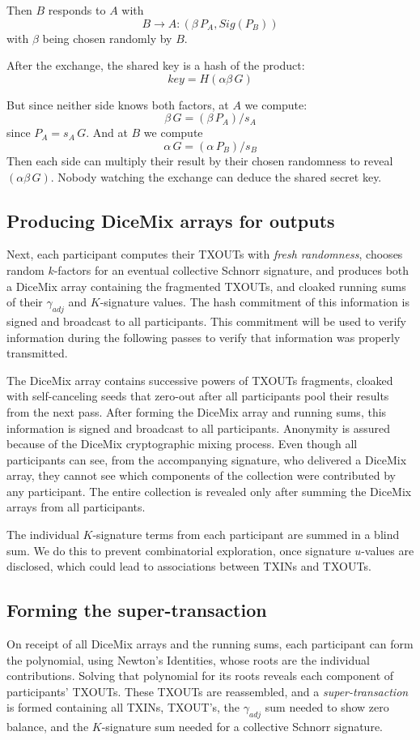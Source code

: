 \documentclass[8pt,fleqn,openany]{book}
\begin{document}
{		Then $B$ responds to $A$ with
		$$B \rightarrow A: (\beta \, P_A, Sig(P_B))$$
		with $\beta$ being chosen randomly by $B$. 
		
		After the exchange, the shared key is a hash of the product:
		$$key = H(\alpha \beta \, G)$$ 
		
		But since neither side knows both factors, at $A$ we compute:
		$$\beta \, G = (\beta \, P_A) / s_A$$
		since $P_A = s_A \, G$. And at $B$ we compute
		$$\alpha \, G = (\alpha \, P_B) / s_B$$
		Then each side can multiply their result by their chosen randomness to reveal $(\alpha \beta \, G)$. Nobody watching the exchange can deduce the shared secret key.
		
		\subsection{Producing DiceMix arrays for outputs} 
		Next, each participant computes their TXOUTs with \textit{fresh randomness}, chooses random $k$-factors for an eventual collective Schnorr signature, and produces both a DiceMix array containing the fragmented TXOUTs, and cloaked running sums of their $\gamma_{adj}$ and $K$-signature values. The hash commitment of this information is signed and broadcast to all participants. This commitment will be used to verify information during the following passes to verify that information was properly transmitted.
		
		The DiceMix array contains successive powers of TXOUTs fragments, cloaked with self-canceling seeds that zero-out after all participants pool their results from the next pass. After forming the DiceMix array and running sums, this information is signed and broadcast to all participants. Anonymity is assured because of the DiceMix cryptographic mixing process. Even though all participants can see, from the accompanying signature, who delivered a DiceMix array, they cannot see which components of the collection were contributed by any participant. The entire collection is revealed only after summing the DiceMix arrays from all participants.
		
		The individual $K$-signature terms from each participant are summed in a blind sum. We do this to prevent combinatorial exploration, once signature $u$-values are disclosed, which could lead to associations between TXINs and TXOUTs.
		
		\subsection{Forming the super-transaction} 
		On receipt of all DiceMix arrays and the running sums, each participant can form the polynomial, using Newton’s Identities, whose roots are the individual contributions. Solving that polynomial for its roots reveals each component of participants’ TXOUTs. These TXOUTs are reassembled, and a \textit{super-transaction} is formed containing all TXINs, TXOUT’s, the $\gamma_{adj}$ sum needed to show zero balance, and the $K$-signature sum needed for a collective Schnorr signature.
		
}
\end{document}
